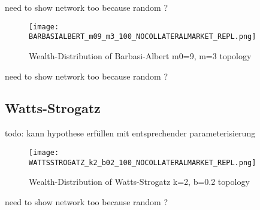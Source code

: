 \documentclass[Bachelorarbeit.tex]{subfiles}
\begin{document}
need to show network too because random ?

\begin{figure}[H]
	\centering
  \texttt{[image: BARBASIALBERT\_m09\_m3\_100\_NOCOLLATERALMARKET\_REPL.png]}
	\caption{Wealth-Distribution of Barbasi-Albert m0=9, m=3 topology}
	\label{fig:wealth_BARBASIALBERT_m09_m3_100_NOCOLLATERALMARKET_REPL}
\end{figure}

need to show network too because random ?

\subsection{Watts-Strogatz}
todo: kann hypothese erfüllen mit entsprechender parameterisierung

\begin{figure}[H]
	\centering
  \texttt{[image: WATTSSTROGATZ\_k2\_b02\_100\_NOCOLLATERALMARKET\_REPL.png]}
	\caption{Wealth-Distribution of Watts-Strogatz k=2, b=0.2 topology}
	\label{fig:wealth_WATTSSTROGATZ_k2_b02_100_NOCOLLATERALMARKET_REPL}
\end{figure}

need to show network too because random ?
\end{document}
